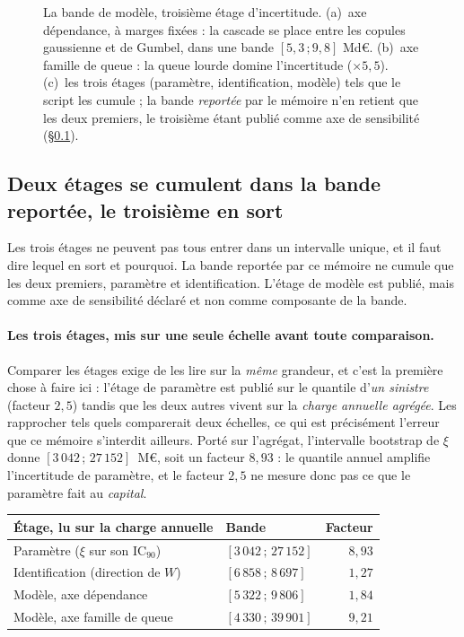 \begin{figure}[htbp]\centering
{}
\caption{La bande de modèle, troisième étage d'incertitude. (a)~axe dépendance, à
marges fixées : la cascade se place entre les copules gaussienne et de Gumbel, dans une bande
$[5{,}3\,;9{,}8]$ Md\euro. (b)~axe famille de queue : la queue lourde domine
l'incertitude ($\times 5{,}5$). (c)~les trois étages (paramètre, identification,
modèle) tels que le script les cumule ; la bande \emph{reportée} par le mémoire n'en retient que
les deux premiers, le troisième étant publié comme axe de sensibilité
(\S\ref{sec:etage-modele-hors-bande}).}
\label{fig:bande-modele}
\end{figure}

\subsection{Deux étages se cumulent dans la bande reportée, le troisième en sort}
\label{sec:etage-modele-hors-bande}

Les trois étages ne peuvent pas tous entrer dans un intervalle unique, et il faut dire lequel
en sort et pourquoi. La bande reportée par ce mémoire ne cumule que les deux premiers,
paramètre et identification. L'étage de modèle est publié, mais comme axe de
sensibilité déclaré et non comme composante de la bande.

\paragraph{Les trois étages, mis sur une seule échelle avant toute comparaison.} Comparer les
étages exige de les lire sur la \emph{même} grandeur, et c'est la première chose à faire ici :
l'étage de paramètre est publié sur le quantile d'\emph{un sinistre} (facteur $2{,}5$) tandis que
les deux autres vivent sur la \emph{charge annuelle agrégée}. Les rapprocher tels quels
comparerait deux échelles, ce qui est précisément l'erreur que ce mémoire s'interdit ailleurs.
Porté sur l'agrégat, l'intervalle bootstrap de $\xi$ donne $[3\,042\,;\,27\,152]$~M\euro, soit un
facteur $8{,}93$ : le quantile annuel amplifie l'incertitude de paramètre, et le facteur
$2{,}5$ ne mesure donc pas ce que le paramètre fait au \emph{capital}.

\begin{center}\footnotesize
\renewcommand{\arraystretch}{1.25}
\begin{tabular}{@{}l l r@{}}
\toprule
\textbf{Étage, lu sur la charge annuelle} & \textbf{Bande} & \textbf{Facteur} \\
\midrule
Paramètre ($\xi$ sur son IC$_{90}$) & $[3\,042\,;\,27\,152]$ & $8{,}93$ \\
Identification (direction de $W$) & $[6\,858\,;\,8\,697]$ & $1{,}27$ \\
Modèle, axe dépendance & $[5\,322\,;\,9\,806]$ & $1{,}84$ \\
Modèle, axe famille de queue & $[4\,330\,;\,39\,901]$ & $9{,}21$ \\
\bottomrule
\end{tabular}
\end{center}

